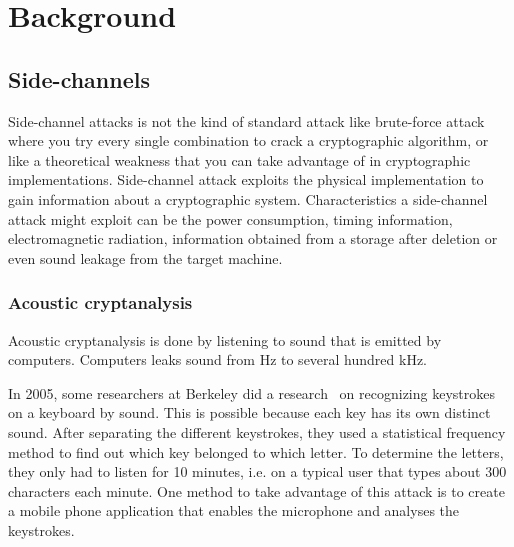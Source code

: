\chapter{Background}
\label{chp:background} 


\section{Side-channels}\label{chp2:sec:side_channel}
Side-channel attacks is not the kind of standard attack like brute-force attack where you try every single combination to crack a cryptographic algorithm, or like a theoretical weakness that you can take advantage of in cryptographic implementations. 
Side-channel attack exploits the physical implementation to gain information about a cryptographic system.
Characteristics a side-channel attack might exploit can be the power consumption, timing information, electromagnetic radiation, information obtained from a storage after deletion or even sound leakage from the target machine.



\subsection{Acoustic cryptanalysis}\label{chp2:subsec:acoustic_cryptanalysis}

Acoustic cryptanalysis is done by listening to sound that is emitted by computers. 
Computers leaks sound from Hz to several hundred kHz. 

In 2005, some researchers at Berkeley did a research~\cite{DBLP:journals/tissec/ZhuangZT09} on recognizing keystrokes on a keyboard by sound. 
This is possible because each key has its own distinct sound. 
After separating the different keystrokes, they used a statistical frequency method to find out which key belonged to which letter. 
To determine the letters, they only had to listen for 10 minutes, i.e. on a typical user that types about 300 characters each minute. 
One method to take advantage of this attack is to create a mobile phone application that enables the microphone and analyses the keystrokes. 

